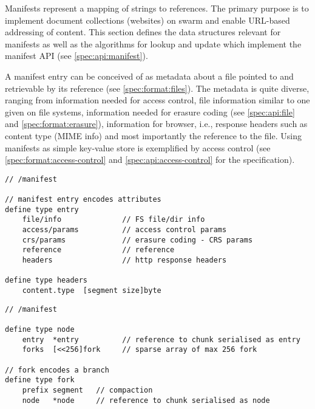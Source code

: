 Manifests represent a mapping of strings to references. The primary purpose is to implement document collections (websites) on swarm and enable URL-based addressing of content. This section defines the data structures relevant for manifests as well as the algorithms for lookup and update which implement the manifest API (see  \ref{spec:api:manifest}).

A manifest entry can be conceived of as metadata about a file pointed to and retrievable by its reference (see \ref{spec:format:files}). The metadata is quite diverse, ranging from information needed for access control, file information similar to one given on file systems, information needed for erasure coding (see  \ref{spec:api:file} and \ref{spec:format:erasure}), information for browser, i.e.,  response headers such as content type (MIME info) and most importantly the reference to the file. Using manifests as simple key-value store is exemplified by access control (see \ref{spec:format:access-control} and \ref{spec:api:access-control} for the specification).

\begin{definition}\label{def:manifest-entry}
\begin{lstlisting}[language=buzz1]
// /manifest

// manifest entry encodes attributes 
define type entry 
    file/info              // FS file/dir info
    access/params          // access control params
    crs/params             // erasure coding - CRS params
    reference              // reference
    headers                // http response headers 

define type headers
    content.type  [segment size]byte

\end{lstlisting}
\end{definition}

\begin{definition}\label{def:manifests}
\begin{lstlisting}[language=buzz1]
// /manifest

define type node 
    entry  *entry          // reference to chunk serialised as entry
    forks  [<<256]fork     // sparse array of max 256 fork

// fork encodes a branch
define type fork 
    prefix segment   // compaction 
    node   *node     // reference to chunk serialised as node

\end{lstlisting}
\end{definition}

